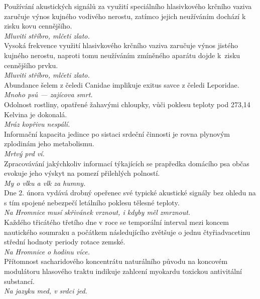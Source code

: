 \begin{multicols}{2}
\noindent
Používání akustických signálů za využití speciálního hlasivkového
krčního vaziva zaručuje výnos kujného vodivého nerostu, zatímco jejich
neužíváním dochází k zisku kovu cennějšího.\\[1 mm]
{\sl Mluviti stříbro, mlčeti zlato.}\\

\noindent
Vysoká frekvence využití hlasivkového krčního vaziva zaručuje
výnos jistého kujného nerostu, naproti tomu neužíváním zmíněného
aparátu dojde k~zisku cennějšího prvku.\\[1 mm]
{\sl Mluviti stříbro, mlčeti zlato.}\\

\noindent
Abundance šelem z čeledi Canidae implikuje exitus savce z
čeledi Leporidae.\\[1 mm]
{\sl Mnoho psů --- zajícova smrt.}\\

\noindent
Odolnost rostliny, opatřené žahavými chloupky, vůči poklesu
teploty pod 273,14 Kelvina je dokonalá.\\[1 mm]
{\sl Mráz kopřivu nespálí.}\\

\noindent
Informační kapacita jedince po sistaci srdeční činnosti je
rovna plynovým zplodinám jeho metabolismu.\\[1 mm]
{\sl Mrtvý prd ví.}\\

\noindent
Zpracovávání jakýchkoliv informací týkajících se prapředka
domácího psa občas evokuje jeho výskyt na pomezí přilehlých
polností.\\[1 mm]
{\sl My o vlku a vlk za humny.}\\

\noindent
Dne 2. února vydává drobný opeřenec své typické akustické
signály bez ohledu na s tím spojené nebezpečí letálního poklesu
tělesné teploty.\\[1 mm]
{\sl Na Hromnice musí skřivánek vrznout, i kdyby měl zmrznout.}\\

\noindent
Každého třicátého třetího dne v roce se temporální interval
mezi koncem nautického soumraku a počátkem následujícího zvětšuje
o jednu čtyřiadvacetinu střední hodnoty periody rotace zemské.\\[1 mm]
{\sl Na Hromnice o hodinu více.}\\

\noindent
Přítomnost sacharidového koncentrátu naturálního původu na
koncovém modulátoru hlasového traktu indikuje zahlcení myokardu
toxickou antivitální substancí.\\[1 mm]
{\sl Na jazyku med, v srdci jed.}\\


\end{multicols}
